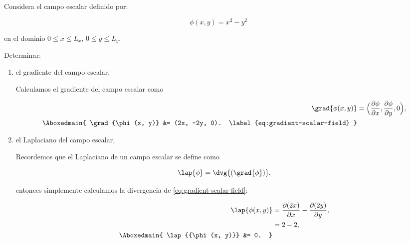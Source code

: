 \documentclass[./../main.tex]{subfiles}
\begin{document}
    \section{}
    
    Considera el campo escalar definido por:

    \begin{equation*}
        \phi(x, y) = x^{2} - y^{2}
    \end{equation*}

    en el dominio \(0 \leq x \leq L_{x}\), \(0 \leq y \leq L_{y}\).

    Determinar:

    \begin{enumerate}[label=\arabic*)]
        \item el gradiente del campo escalar,
        
        Calculamos el gradiente del campo escalar como

        \begin{align}
            \grad{\phi(x, y)} &= \Bigl( \pdv{\phi}{x}, \pdv{\phi}{y}, 0\Bigr),\nonumber\\
            \Aboxedmain{
                \grad{\phi(x, y)} &= (2x, -2y, 0).
                \label{eq:gradient-scalar-field}
            }
        \end{align}
        
        \item el Laplaciano del campo escalar,
        
        Recordemos que el Laplaciano de un campo escalar se define como

        \begin{equation*}
            \lap{\phi} = \dvg{(\grad{\phi})},
        \end{equation*}

        entonces simplemente calculamos la divergencia de \cref{eq:gradient-scalar-field}:

        \begin{align*}
            \lap{{\phi(x, y)}} &= \pdv{(2x)}{x} - \pdv{(2y)}{y},\\
            &= 2 - 2,\\
            \Aboxedmain{
                \lap{{\phi(x, y)}} &= 0.
            }
        \end{align*}
    \end{enumerate}
\end{document}
